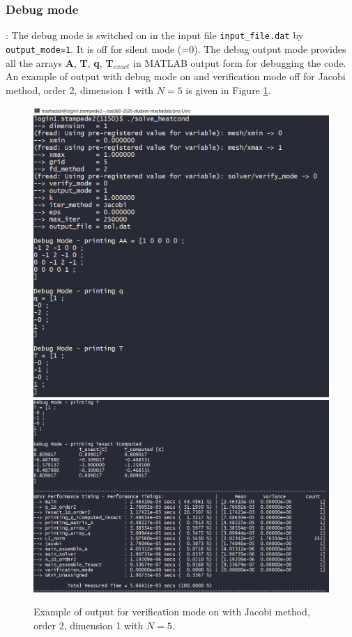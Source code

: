 \documentclass[12pt]{amsart}   %
\begin{document}
\subsubsection{Debug mode}: 
The debug mode is switched on in the input file {\tt{input\_file.dat}} by {\tt{output\_mode=1}}. It is off for silent mode (=0). The debug output mode provides all the arrays \textbf{A}, \textbf{T}, \textbf{q}, \textbf{T}$_{exact}$ in MATLAB output form for debugging the code. An example of output with debug mode on and verification mode off for Jacobi method, order 2, dimension 1 with $N=5$ is given in Figure \ref{fig:5}.

\begin{figure}[htbp!]
\centering
    \includegraphics[width=1.1\linewidth]{Project1photos/debug1.png}
    \includegraphics[width=1.1\linewidth, trim= 0 0 0 4cm, clip]{Project1photos/debug2.png}
    \caption{Example of output for verification mode on with Jacobi method, order 2, dimension 1 with $N=5$.}
    \label{fig:5}
\end{figure}
\end{document}
